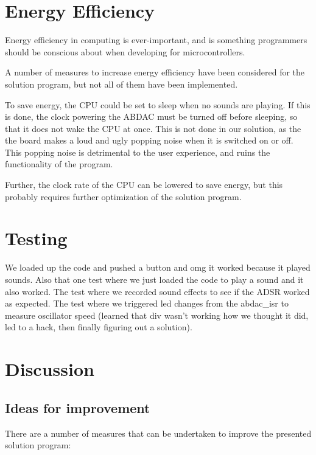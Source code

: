 \section{Energy Efficiency}

Energy efficiency in computing is ever-important, and is something programmers should be conscious about when developing for microcontrollers.

A number of measures to increase energy efficiency have been considered for the solution program, but not all of them have been implemented.

To save energy, the CPU could be set to sleep when no sounds are playing.
If this is done, the clock powering the ABDAC must be turned off before sleeping, so that it does not wake the CPU at once.
This is not done in our solution, as the the board makes a loud and ugly popping noise when it is switched on or off.
This popping noise is detrimental to the user experience, and ruins the functionality of the program.

Further, the clock rate of the CPU can be lowered to save energy, but this probably requires further optimization of the solution program.

\section{Testing}
We loaded up the code and pushed a button and omg it worked because it played sounds.
Also that one test where we just loaded the code to play a sound and it also worked.
The test where we recorded sound effects to see if the ADSR worked as expected.
The test where we triggered led changes from the abdac\_isr to measure oscillator speed (learned that div wasn't working how we thought it did, led to a hack, then finally figuring out a solution).


\section{Discussion}



\subsection{Ideas for improvement}

There are a number of measures that can be undertaken to improve the presented solution program:

